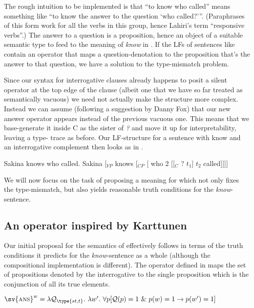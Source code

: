 The rough intuition to be implemented is that ``to know who called'' means
something like ``to know the answer to the question `who called?'''.
(Paraphrases of this form work for all the verbs in this group, hence Lahiri's
term ``responsive verbs''.) The answer to a question is a proposition, hence an
object of a suitable semantic type to feed to the meaning of \emph{know} in
\Last. If the LFs of sentences like  contain an operator that
maps a question-denotation to the proposition that's the answer to that
question, we have a solution to the type-mismatch problem.

Since our syntax for interrogative clauses already happens to posit a silent
operator at the top edge of the clause (albeit one that we have so far treated
as semantically vacuous) we need not actually make the structure more complex.
Instead we can assume (following a suggestion by Danny Fox) that our new answer
operator appears instead of the previous vacuous one. This means that we
base-generate it inside C as the sister of \emph{?} and move it up for
interpretability, leaving a type- trace as before. Our LF-structure
for a sentence with know and an interrogative complement then looks as in
\Next[b].

\pex\label{ex:knows-who}
\a Sakina knows who called.
\a Sakina [$_{VP}$ knows [$_{CP}$  [ who 2 [[$_{C}$ ? $t_{1}$]
$t_{2}$ called]]]]
\xe

We will now focus on the task of proposing a meaning for \ans which not only
fixes the type-mismatch, but also yields reasonable truth conditions for the
\emph{know}-sentence.

\subsection{An \ans operator inspired by Karttunen}
\label{sec:ans-karttunen}

Our initial proposal for the semantics of \ans effectively follows
\cite{karttunen-1977-questions} in terms of the truth conditions it predicts for
the \emph{know}-sentence as a whole (although the compositional implementation
is different). The \ans operator defined in \Next maps the set of propositions
denoted by the interrogative to the single proposition which is the conjunction
of all its true elements.

\ex
$\sv{\ans}^{w} = \lambda \mathcal{Q}_{\type{st,t}}.\ \lambda w'.\ \forall p [\mathcal{Q}(p)=1\ \&\ p(w)=1 \rightarrow p(w')=1]$
\xe


